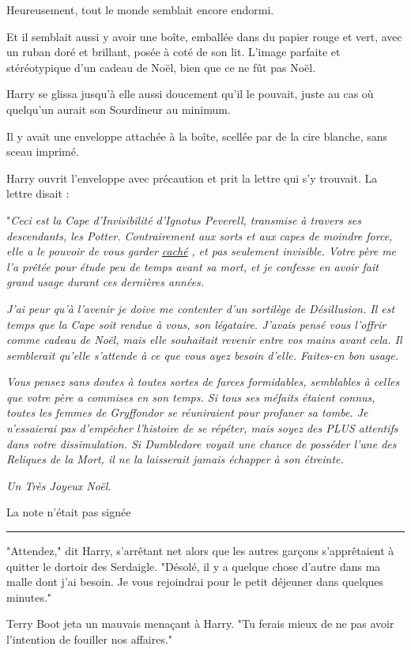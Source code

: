 Heureusement, tout le monde semblait encore endormi.

Et il semblait aussi y avoir une boîte, emballée dans du papier rouge et vert, avec un ruban doré et brillant, posée à coté de son lit. L'image parfaite et stéréotypique d'un cadeau de Noël, bien que ce ne fût pas Noël.

Harry se glissa jusqu'à elle aussi doucement qu'il le pouvait, juste au cas où quelqu'un aurait son Sourdineur au minimum.

Il y avait une enveloppe attachée à la boîte, scellée par de la cire blanche, sans sceau imprimé.

Harry ouvrit l'enveloppe avec précaution et prit la lettre qui s'y trouvait. La lettre disait :

"\emph{Ceci est la Cape d'Invisibilité d'Ignotus Peverell, transmise à travers ses descendants, les Potter. Contrairement aux sorts et aux capes de moindre force, elle a le pouvoir de vous garder } \emph{\underline{caché}} \emph{, et pas seulement invisible. Votre père me l'a prêtée pour étude peu de temps avant sa mort, et je confesse en avoir fait grand usage durant ces dernières années.} 

\emph{J'ai peur qu'à l'avenir je doive me contenter d'un sortilège de Désillusion. Il est temps que la Cape soit rendue à vous, son légataire. J'avais pensé vous l'offrir comme cadeau de Noël, mais elle souhaitait revenir entre vos mains avant cela. Il semblerait qu'elle s'attende à ce que vous ayez besoin d'elle. Faites-en bon usage.} 

\emph{Vous pensez sans doutes à toutes sortes de farces formidables, semblables à celles que votre père a commises en son temps. Si tous ses méfaits étaient connus, toutes les femmes de Gryffondor se réuniraient pour profaner sa tombe. Je n'essaierai pas d'empêcher l'histoire de se répéter, mais soyez des PLUS attentifs dans votre dissimulation. Si Dumbledore voyait une chance de posséder l'une des Reliques de la Mort, il ne la laisserait jamais échapper à son étreinte.} 

\emph{Un Très Joyeux Noël.} 

La note n'était pas signée
\par\noindent\rule{\textwidth}{0.4pt}
"Attendez," dit Harry, s'arrêtant net alors que les autres garçons s'apprêtaient à quitter le dortoir des Serdaigle. "Désolé, il y a quelque chose d'autre dans ma malle dont j'ai besoin. Je vous rejoindrai pour le petit déjeuner dans quelques minutes."

Terry Boot jeta un mauvais menaçant à Harry. "Tu ferais mieux de ne pas avoir l'intention de fouiller nos affaires."

